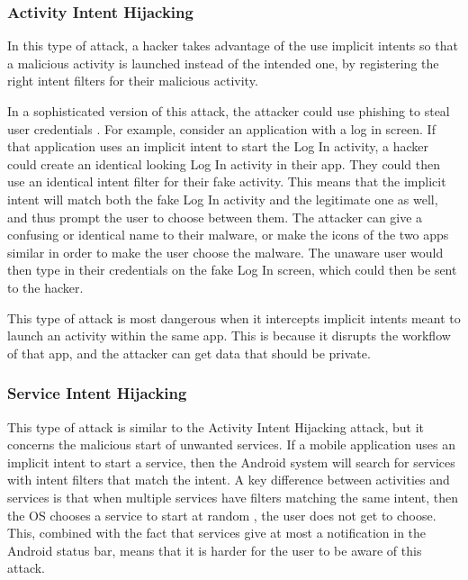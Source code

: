     \subsubsection{Activity Intent Hijacking}
        \label{subsubsec:activity_hijacking}
        
    In this type of attack, a hacker takes advantage of the use implicit intents so that a malicious activity is launched instead of the intended one, by registering the right intent filters for their malicious activity.
    
    In a sophisticated version of this attack, the attacker could use phishing to steal user credentials \cite{2010_icc_paper}. For example, consider an application with a log in screen. If that application uses an implicit intent to start the Log In activity, a hacker could create an identical looking Log In activity in their app. They could then use an identical intent filter for their fake activity. This means that the implicit intent will match both the fake Log In activity and the legitimate one as well, and thus prompt the user to choose between them. The attacker can give a confusing or identical name to their malware, or make the icons of the two apps similar in order to make the user choose the malware. The unaware user would then type in their credentials on the fake Log In screen, which could then be sent to the hacker.
    
    This type of attack is most dangerous when it intercepts implicit intents meant to launch an activity within the same app. This is because it disrupts the workflow of that app, and the attacker can get data that should be private.
    
    \subsubsection{Service Intent Hijacking}
        \label{subsubsec:service_hijacking}
        
    This type of attack is similar to the Activity Intent Hijacking attack, but it concerns the malicious start of unwanted services. If a mobile application uses an implicit intent to start a service, then the Android system will search for services with intent filters that match the intent. A key difference between activities and services is that when multiple services have filters matching the same intent, then the OS chooses a service to start at random \cite{startService}, the user does not get to choose. This, combined with the fact that services give at most a notification in the Android status bar, means that it is harder for the user to be aware of this attack.
    
